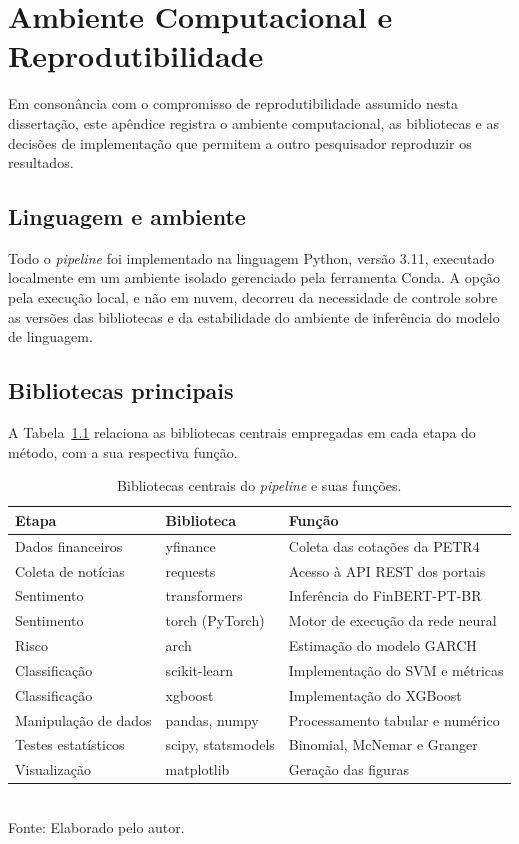 \chapter{Ambiente Computacional e Reprodutibilidade} \label{ap:reprodutibilidade}

Em consonância com o compromisso de reprodutibilidade assumido nesta dissertação, este apêndice registra o ambiente computacional, as bibliotecas e as decisões de implementação que permitem a outro pesquisador reproduzir os resultados.

\section{Linguagem e ambiente}

Todo o \textit{pipeline} foi implementado na linguagem Python, versão 3.11, executado localmente em um ambiente isolado gerenciado pela ferramenta Conda. A opção pela execução local, e não em nuvem, decorreu da necessidade de controle sobre as versões das bibliotecas e da estabilidade do ambiente de inferência do modelo de linguagem.

\section{Bibliotecas principais}

A Tabela~\ref{tab:bibliotecas} relaciona as bibliotecas centrais empregadas em cada etapa do método, com a sua respectiva função.

\begin{table}[htpb]
\centering
\caption{Bibliotecas centrais do \textit{pipeline} e suas funções.}
\label{tab:bibliotecas}
\begin{tabular}{lll}
\hline
\textbf{Etapa} & \textbf{Biblioteca} & \textbf{Função} \\ \hline
Dados financeiros & yfinance & Coleta das cotações da PETR4 \\
Coleta de notícias & requests & Acesso à API REST dos portais \\
Sentimento & transformers & Inferência do FinBERT-PT-BR \\
Sentimento & torch (PyTorch) & Motor de execução da rede neural \\
Risco & arch & Estimação do modelo GARCH \\
Classificação & scikit-learn & Implementação do SVM e métricas \\
Classificação & xgboost & Implementação do XGBoost \\
Manipulação de dados & pandas, numpy & Processamento tabular e numérico \\
Testes estatísticos & scipy, statsmodels & Binomial, McNemar e Granger \\
Visualização & matplotlib & Geração das figuras \\ \hline
\end{tabular}
\vspace{0.2cm}
{\small \\ Fonte: Elaborado pelo autor.}
\end{table}

